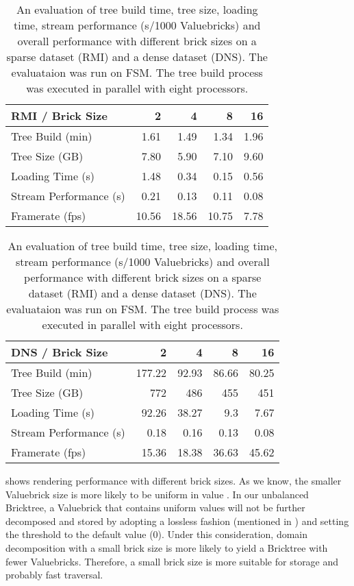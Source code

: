 \begin{table}[h!]
	\centering
	\begin{tabularx}{\linewidth}{l*{4}{r}}
		\toprule  
		\textbf{RMI / Brick Size}   & \textbf{2} & \textbf{4} & \textbf{8} & \textbf{16}  \\
		\hline
		Tree Build (min) & 1.61 & 1.49 & 1.34 & 1.96  \\
        Tree Size (GB) & 7.80 & 5.90 & 7.10 & 9.60  \\
        Loading Time (s) & 1.48 & 0.34 & 0.15 & 0.56  \\
        Stream Performance (s) & 0.21 & 0.13 & 0.11 & 0.08  \\
        Framerate (fps) & 10.56 & 18.56 & 10.75 & 7.78  \\
		\bottomrule
	\end{tabularx}
    \begin{tabularx}{\linewidth}{l*{4}{r}}
		\toprule  
		\textbf{DNS / Brick Size}   & \textbf{2} & \textbf{4} & \textbf{8} & \textbf{16}  \\
		\hline
		Tree Build (min) & 177.22 & 92.93 & 86.66 & 80.25  \\
        Tree Size (GB) & 772 & 486 & 455 & 451  \\
        Loading Time (s) & 92.26 & 38.27 & 9.3 & 7.67  \\
        Stream Performance (s) & 0.18 & 0.16 & 0.13 & 0.08  \\
        Framerate (fps) & 15.36 & 18.38 & 36.63 & 45.62  \\
		\bottomrule
	\end{tabularx}
	\caption{An evaluation of tree build time, tree size, loading time, stream performance (s/1000 Valuebricks) and overall performance with different brick sizes on a sparse dataset (RMI) and a dense dataset (DNS). The evaluataion was run on FSM. The tree build process was executed in parallel with eight processors.}
	\label{table:brick_size}
\end{table}

 shows rendering performance with different brick sizes.
As we know, the smaller Valuebrick size is more likely to be uniform in value 
\cite{fogal2013analysis}. In our unbalanced Bricktree, a Valuebrick that contains
uniform values will not be further decomposed and stored by adopting a lossless 
fashion (mentioned in ) and setting the threshold 
to the default value (0). Under this consideration, domain decomposition with a 
small brick size is more likely to yield a Bricktree with fewer Valuebricks. 
Therefore, a small brick size is more suitable for storage and probably fast traversal. 


